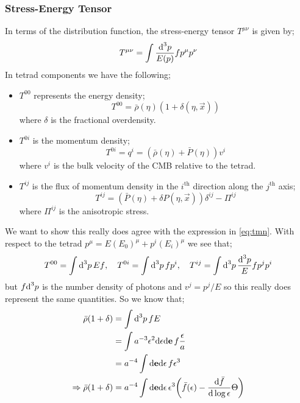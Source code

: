 \subsubsection{Stress-Energy Tensor}
In terms of the distribution function, the stress-energy tensor $T^{\mu\nu}$ is given by;
\begin{equation}
\label{eq:tmn}
T^{\mu\nu} = \int{\frac{\text{d}^3 p}{E(p)}fp^{\mu}p^{\nu}}
\end{equation}
In tetrad components we have the following;
\begin{itemize}
\item $T^{00}$ represents the energy density;
\begin{equation*}
T^{00} = \bar{\rho}(\eta)\left(1 + \delta(\eta, \vec x)\right)
\end{equation*}
where $\delta$ is the fractional overdensity.
\item $T^{0i}$ is the momentum density;
\begin{equation*}
T^{0i} = q^{i} = \left(\bar{\rho}(\eta) + \bar{P}(\eta)\right)v^{i}
\end{equation*}
where $v^{i}$ is the bulk velocity of the CMB relative to the tetrad.
\item $T^{ij}$ is the flux of momentum density in the $i^{\text{th}}$ direction along the $j^{\text{th}}$ axis;
\begin{equation*}
T^{ij} = \left(\bar{P}(\eta) + \delta P(\eta, \vec x)\right)\delta^{ij} - \Pi^{ij}
\end{equation*}
where $\Pi^{ij}$ is the anisotropic stress.
\end{itemize}
We want to show this really does agree with the expression in \eqref{eq:tmn}. With respect to the tetrad $p^{\mu} = E(E_0)^{\mu} + p^{i}(E_i)^{\mu}$ we see that;
\begin{equation*}
T^{00} = \int{\text{d}^3 p \,Ef}, \quad T^{0i} = \int{\text{d}^3 p \,f p^{i}}, \quad T^{ij} = \int{\text{d}^3 p \, \frac{\text{d}^3 p}{E}fp^{j}p^{i}}
\end{equation*}
but $f\text{d}^3 p$ is the number density of photons and $v^{j} = p^{j}/E$ so this really does represent the same quantities. So we know that;
\begin{align*}
\bar{\rho}(1 + \delta) &= \int{\upd{^3 p} fE} \\
&= \int{a^{-3}\epsilon^2 \ud \epsilon \upd{\vec e} f \frac{\epsilon}{a}} \\
&= a^{-4}\int{\ud\vec e\upd{\epsilon}f\epsilon^3} \\
\Rightarrow \bar{\rho}(1 + \delta) &= a^{-4}\int{\ud \vec e\upd{\epsilon} \epsilon^3 \left(\bar{f}(\epsilon) - \frac{\ud \bar{f}}{\ud \log \epsilon}\Theta\right)}
\end{align*}
